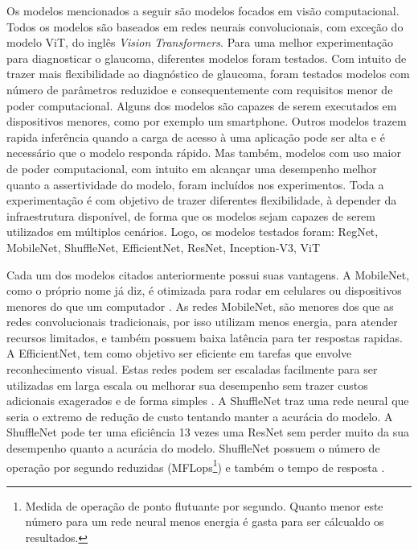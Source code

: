 \documentclass[ %
	msc, %
	portugues %
]{../ppgccufmg}
\begin{document}
    Os modelos mencionados a seguir são modelos focados em visão computacional. Todos os modelos são
    baseados em redes  neurais convolucionais, com exceção do modelo ViT, do inglês \textit{Vision
    Transformers}. Para uma melhor experimentação para diagnosticar o glaucoma, diferentes modelos
    foram testados. Com intuito de trazer mais flexibilidade ao diagnóstico de glaucoma, foram testados modelos com
    número de parâmetros reduzidoe e consequentemente com requisitos menor de poder computacional. Alguns dos modelos
    são capazes de serem executados em dispositivos menores, como por exemplo um smartphone. Outros
    modelos trazem rapida inferência quando a carga de acesso à uma aplicação pode ser alta e é
    necessário que o modelo responda rápido. Mas também, modelos com uso maior de poder
    computacional, com intuito em alcançar uma desempenho melhor quanto a assertividade do modelo, foram
    incluídos nos experimentos. Toda a experimentação é com objetivo de trazer diferentes
    flexibilidade, à depender da infraestrutura disponível, de forma que os modelos sejam capazes de
    serem utilizados em múltiplos cenários. Logo, os modelos testados foram: RegNet, MobileNet,
    ShuffleNet, EfficientNet, ResNet, Inception-V3, ViT
    \citep{https://doi.org/10.48550/arxiv.2101.00590,DBLP:journals/corr/HowardZCKWWAA17,
    DBLP:journals/corr/ZhangZLS17, DBLP:journals/corr/HeZRS15,
    DBLP:journals/corr/SzegedyVISW15, DBLP:journals/corr/abs-2010-11929, efficientnet}

    Cada um dos modelos citados anteriormente possui suas vantagens. A MobileNet, como
    o próprio nome já diz, é otimizada para rodar em celulares ou dispositivos menores do que um
    computador \citep{DBLP:journals/corr/HowardZCKWWAA17}. As redes MobileNet, são menores dos que
    as redes convolucionais tradicionais, por isso utilizam menos energia, para atender recursos
    limitados, e também possuem baixa latência para ter respostas rapidas. A EfficientNet, tem como objetivo ser eficiente em tarefas que envolve
    reconhecimento visual. Estas redes podem ser escaladas facilmente para
    ser utilizadas em larga escala ou melhorar sua desempenho sem trazer custos adicionais
    exagerados e de forma simples \citep{efficientnet}. A ShuffleNet traz uma rede neural que seria o extremo de redução
    de custo tentando manter a acurácia do modelo.  A ShuffleNet pode ter uma eficiência 13 vezes
    uma ResNet sem perder muito da sua desempenho quanto a acurácia do modelo. ShuffleNet possuem o
    número de operação por segundo reduzidas (MFLops\footnote{Medida de operação de ponto flutuante
    por segundo. Quanto menor este número para um rede neural menos energia é gasta para ser
    cálcualdo os resultados.}) e também o tempo de resposta \citep{DBLP:journals/corr/ZhangZLS17}.
\end{document}
